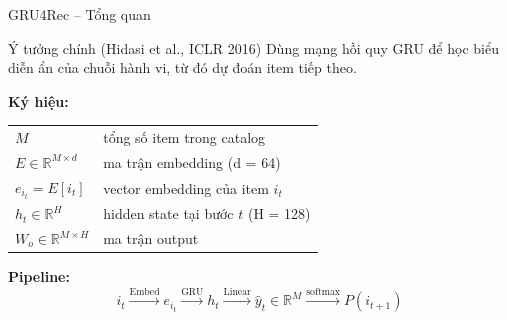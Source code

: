 \documentclass[aspectratio=169, 11pt]{beamer}
\begin{document}
\begin{frame}{GRU4Rec -- Tổng quan}
\begin{block}{Ý tưởng chính (Hidasi et al., ICLR 2016)}
Dùng mạng hồi quy GRU để học biểu diễn ẩn của chuỗi hành vi, từ đó dự đoán item tiếp theo.
\end{block}

\vspace{0.3cm}
\textbf{Ký hiệu:}
\begin{table}
\centering
\small
\begin{tabular}{ll}
$M$ & tổng số item trong catalog \\
$E \in \mathbb{R}^{M \times d}$ & ma trận embedding (d = 64) \\
$e_{i_t} = E[i_t]$ & vector embedding của item $i_t$ \\
$h_t \in \mathbb{R}^{H}$ & hidden state tại bước $t$ (H = 128) \\
$W_o \in \mathbb{R}^{M \times H}$ & ma trận output \\
\end{tabular}
\end{table}

\vspace{0.3cm}
\textbf{Pipeline:}
$$i_t \xrightarrow{\text{Embed}} e_{i_t} \xrightarrow{\text{GRU}} h_t \xrightarrow{\text{Linear}} \hat{y}_t \in \mathbb{R}^M \xrightarrow{\text{softmax}} P(i_{t+1})$$
\end{frame}
\end{document}

